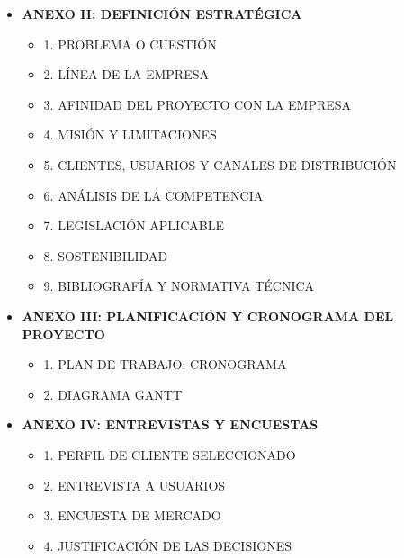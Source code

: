\documentclass[11pt,a4paper]{article}
\begin{document}
\begin{itemize}[label={}, leftmargin=0cm, itemsep=1.2em]
\begin{itemize}[label=\color{ArthroTeal}\textbullet, leftmargin=0.6cm, itemsep=0.5em, topsep=0.3cm]
        \item \textbf{ANEXO II: DEFINICIÓN ESTRATÉGICA} 
        \begin{itemize}[label=\color{ArthroGray}\circ, leftmargin=0.5cm, itemsep=0.2em, topsep=0.1cm]
            \small
            \item 1. PROBLEMA O CUESTIÓN
            \item 2. LÍNEA DE LA EMPRESA 
            \item 3. AFINIDAD DEL PROYECTO CON LA EMPRESA 
            \item 4. MISIÓN Y LIMITACIONES
            \item 5. CLIENTES, USUARIOS Y CANALES DE DISTRIBUCIÓN 
            \item 6. ANÁLISIS DE LA COMPETENCIA 
            \item 7. LEGISLACIÓN APLICABLE 
            \item 8. SOSTENIBILIDAD 
            \item 9. BIBLIOGRAFÍA Y NORMATIVA TÉCNICA 
        \end{itemize}
        
        \item \textbf{ANEXO III: PLANIFICACIÓN Y CRONOGRAMA DEL PROYECTO} 
        \begin{itemize}[label=\color{ArthroGray}\circ, leftmargin=0.5cm, itemsep=0.2em, topsep=0.1cm]
            \small
            \item 1. PLAN DE TRABAJO: CRONOGRAMA 
            \item 2. DIAGRAMA GANTT 
            
        \end{itemize}
        
        \item \textbf{ANEXO IV: ENTREVISTAS Y ENCUESTAS} 
        \begin{itemize}[label=\color{ArthroGray}\circ, leftmargin=0.5cm, itemsep=0.2em, topsep=0.1cm]
            \small
            \item 1. PERFIL DE CLIENTE SELECCIONADO 
            \item 2. ENTREVISTA A USUARIOS 
            \item 3. ENCUESTA DE MERCADO
            \item 4. JUSTIFICACIÓN DE LAS DECISIONES 
        \end{itemize}
        

\end{itemize}
\end{itemize}
\end{document}
